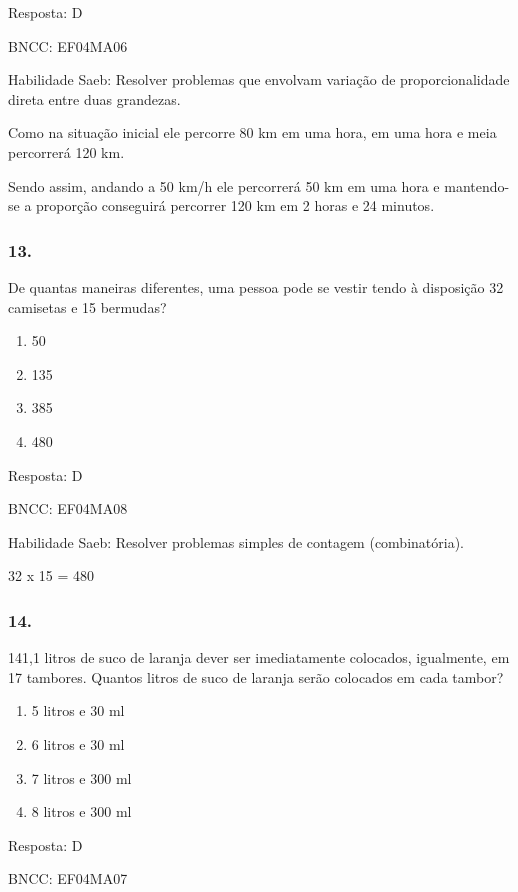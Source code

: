 Resposta: D

BNCC: EF04MA06

Habilidade Saeb: Resolver problemas que envolvam variação de
proporcionalidade direta entre duas grandezas.

Como na situação inicial ele percorre 80 km em uma hora, em uma hora e
meia percorrerá 120 km.

Sendo assim, andando a 50 km/h ele percorrerá 50 km em uma hora e
mantendo-se a proporção conseguirá percorrer 120 km em 2 horas e 24
minutos.

\subsubsection{13. }\label{section-154}

De quantas maneiras diferentes, uma pessoa pode se vestir tendo à
disposição 32 camisetas e 15 bermudas?

\begin{enumerate}
\def\labelenumi{\alph{enumi})}
\item
  50
\item
  135
\item
  385
\item
  480
\end{enumerate}

Resposta: D

BNCC: EF04MA08

Habilidade Saeb: Resolver problemas simples de contagem (combinatória).

32 x 15 = 480

\subsubsection{14.}\label{section-155}

141,1 litros de suco de laranja dever ser imediatamente colocados,
igualmente, em 17 tambores. Quantos litros de suco de laranja serão
colocados em cada tambor?

\begin{enumerate}
\def\labelenumi{\alph{enumi})}
\item
  5 litros e 30 ml
\item
  6 litros e 30 ml
\item
  7 litros e 300 ml
\item
  8 litros e 300 ml
\end{enumerate}

Resposta: D

BNCC: EF04MA07

